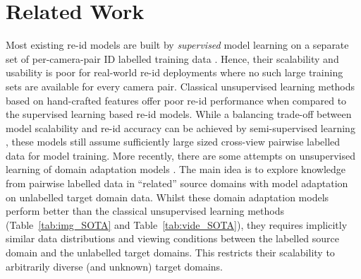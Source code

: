 \documentclass[runningheads]{llncs}
\begin{document}
\section{Related Work}
Most existing re-id models are built by {\em supervised} model learning
on a separate set of per-camera-pair ID labelled training data
\cite{li2014deepreid,cheng2016person,ahmed2015improved,subramaniam2016deep,xiao2016learning,wang2016joint,li2017person,chen2017beyond,jiao2018deep,wang2016person,cho2016improving,chen2017person,chen2018person,zhu2017fast,wang2018person,hermans2017defense,zhang2017deep,li2018harmonious}.
Hence, their scalability and usability is poor for 
real-world re-id deployments
where no such large training sets are available
for every camera pair.
Classical unsupervised learning methods based on hand-crafted features
offer poor re-id performance \cite{farenzena2010person,ma2017person,
  kodirov2015dictionary,kodirov2016person,khan2016unsupervised,ye2017dynamic,liu2017stepwise,
  lisanti2015person,wang2016towards,wang2014unsupervised,zhao2017person}
when compared to the supervised learning based re-id models.
While a balancing trade-off between model scalability and re-id accuracy
can be achieved by semi-supervised learning
\cite{liu2014semi,wang2016towards}, these models still assume
sufficiently large sized cross-view pairwise labelled data for model training. 
More recently, there are some attempts on unsupervised learning of
domain adaptation models
\cite{want2018Transfer,peng2016unsupervised,fan2017unsupervised,yu2017cross,su2016deep}. 
The main idea is to explore knowledge from pairwise labelled data in
``related'' source domains with model adaptation on unlabelled target
domain data.
Whilst these domain adaptation models perform better than the
classical unsupervised learning methods (Table~\ref{tab:img_SOTA} and Table~\ref{tab:vide_SOTA}),
they requires implicitly similar data distributions and viewing
conditions between the labelled source domain and the unlabelled
target domains. This restricts their scalability to arbitrarily
diverse (and unknown) target domains.
\end{document}
